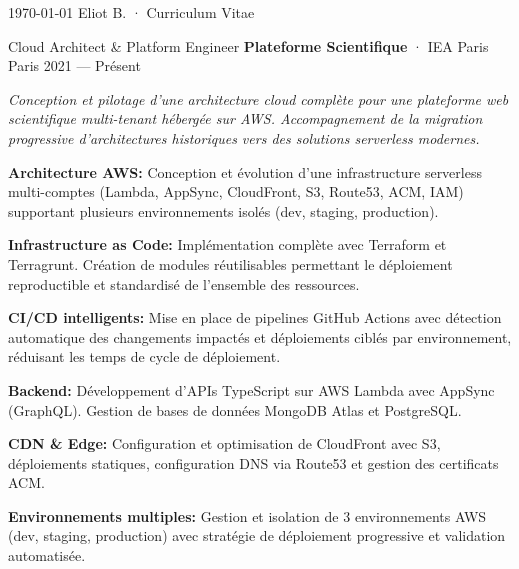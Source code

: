 \documentclass[11pt, a4paper]{awesome-cv}
\begin{document}
\makecvheader[C]

\makecvfooter
  {\today}
  {Eliot B. · Curriculum Vitae}
  {\thepage}


\begin{cvskills}
\end{cvskills}


\cventry
  {Cloud Architect \& Platform Engineer}
  {\textbf{Plateforme Scientifique} · IEA Paris}
  {Paris}
  {2021 — Présent}
  {\textit{Conception et pilotage d'une architecture cloud complète pour une plateforme web scientifique multi-tenant hébergée sur AWS. Accompagnement de la migration progressive d'architectures historiques vers des solutions serverless modernes.}
  \begin{cvitems}
    \item \textbf{Architecture AWS:} Conception et évolution d'une infrastructure serverless multi-comptes (Lambda, AppSync, CloudFront, S3, Route53, ACM, IAM) supportant plusieurs environnements isolés (dev, staging, production).
    \item \textbf{Infrastructure as Code:} Implémentation complète avec Terraform et Terragrunt. Création de modules réutilisables permettant le déploiement reproductible et standardisé de l'ensemble des ressources.
    \item \textbf{CI/CD intelligents:} Mise en place de pipelines GitHub Actions avec détection automatique des changements impactés et déploiements ciblés par environnement, réduisant les temps de cycle de déploiement.
    \item \textbf{Backend:} Développement d'APIs TypeScript sur AWS Lambda avec AppSync (GraphQL). Gestion de bases de données MongoDB Atlas et PostgreSQL.
    \item \textbf{CDN \& Edge:} Configuration et optimisation de CloudFront avec S3, déploiements statiques, configuration DNS via Route53 et gestion des certificats ACM.
    \item \textbf{Environnements multiples:} Gestion et isolation de 3 environnements AWS (dev, staging, production) avec stratégie de déploiement progressive et validation automatisée.
  \end{cvitems}}
\end{document}
